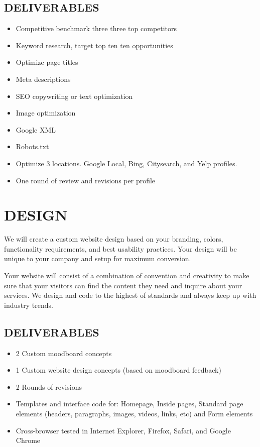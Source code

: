 \documentclass[12pt]{report}
\begin{document}
\subsection{DELIVERABLES}
\begin{itemize}
\item Competitive benchmark three three top competitors
\item Keyword research, target top ten ten opportunities
\item Optimize page titles
\item Meta descriptions
\item SEO copywriting or text optimization
\item Image optimization
\item Google XML
\item Robots.txt
\item Optimize 3 locations. Google Local, Bing, Citysearch, and Yelp profiles. 
\item One round of review and revisions per profile
\end{itemize}

\section{DESIGN}
\item We will create a custom website design based on your branding, colors, functionality requirements, and best usability practices. Your design will be unique to your company and setup for maximum conversion.
\item Your website will consist of a combination of convention and creativity to make sure that your visitors can find the content they need and inquire about your services. We design and code to the highest of standards and always keep up with industry trends.
\subsection{DELIVERABLES}
\begin{itemize}
\item 2 Custom moodboard concepts
\item 1 Custom website design concepts (based on moodboard feedback)
\item 2 Rounds of revisions
\item Templates and interface code for: Homepage, Inside pages, Standard page elements (headers, paragraphs, images, videos, links, etc) and Form elements
\item Cross-browser tested in Internet Explorer, Firefox, Safari, and Google Chrome
\end{itemize}
\end{document}
